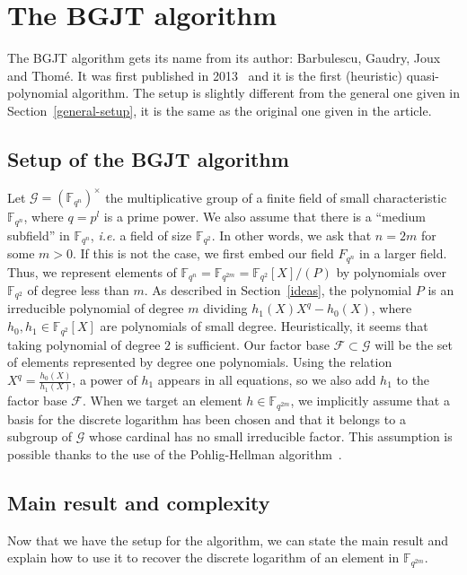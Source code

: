 \documentclass[a4paper,11pt]{article}
\theoremstyle{break}
\theoremstyle{sc}
\theoremstyle{definition}
\theoremstyle{remark}
\newcommand{\ie}{\emph{i.e. }}
\begin{document}
\section{The BGJT algorithm}
\label{bgjt}

The BGJT algorithm gets its name from its author: Barbulescu, Gaudry, Joux and
Thomé. It was first published in 2013~\cite{BGJT13} and it is the first
(heuristic) quasi-polynomial algorithm. The setup is slightly different from the
general one given in Section~\ref{general-setup}, it is the same as the original
one given in the article.

\subsection{Setup of the BGJT algorithm}

Let $\mathcal G = (\mathbb{F}_{q^n})^\times$ the multiplicative group of a finite
field of small characteristic $\mathbb{F}_{q^n}$, where $q=p^l$ is a prime
power. We also assume that there is a ``medium subfield'' in
$\mathbb{F}_{q^n}$, \ie a field of size $\mathbb{F}_{q^2}$. In other words, we
ask that $n = 2m$ for some $m>0$. If this is not the case, we first embed our
field $F_{q^n}$ in a larger field. Thus, we represent elements of
$\mathbb{F}_{q^n} = \mathbb{F}_{q^{2m}} = \mathbb{F}_{q^2}[X]/(P)$ by
polynomials over $\mathbb{F}_{q^2}$ of degree less than
$m$. As described in Section~\ref{ideas}, the polynomial $P$ is an irreducible
polynomial of degree $m$ dividing $h_1(X)X^q-h_0(X)$, where $h_0,
h_1\in\mathbb{F}_{q^2}[X]$ are polynomials of small degree. Heuristically, it
seems that taking polynomial of degree $2$ is sufficient. Our factor base
$\mathcal F\subset\mathcal G$ will be the set of elements represented by degree
one polynomials. Using the relation $X^q=\frac{h_0(X)}{h_1(X)}$, a power of
$h_1$ appears in all equations, so we also add $h_1$ to the factor base
$\mathcal F$. When we target an element $h\in\mathbb{F}_{q^{2m}}$, we implicitly
assume that a basis for the discrete logarithm has been chosen and that it
belongs to a subgroup of $\mathcal G$ whose cardinal has no small irreducible
factor. This assumption is possible thanks to the use of the Pohlig-Hellman
algorithm~\cite{PH78}.

\subsection{Main result and complexity}

Now that we have the setup for the algorithm, we can state the main result and
explain how to use it to recover the discrete logarithm of an element in
$\mathbb{F}_{q^{2m}}$.
\end{document}
